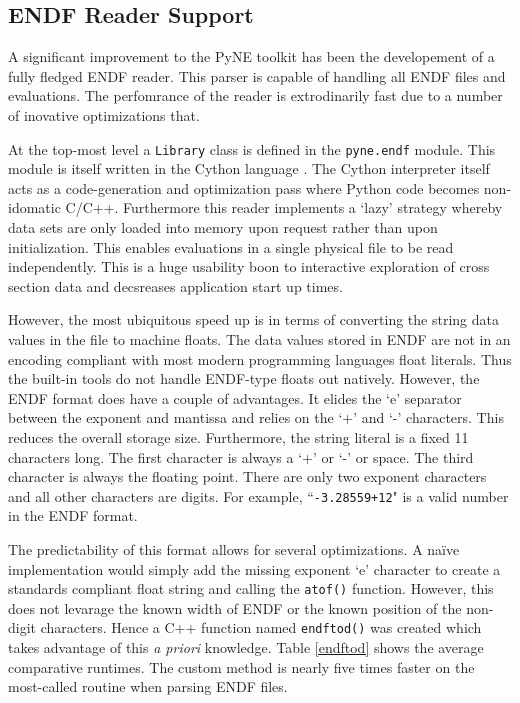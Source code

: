 \documentclass{ansconf}
\begin{document}
\subsection{ENDF Reader Support}

A significant improvement to the PyNE toolkit has been the developement of 
a fully fledged ENDF \cite{mclane2001endf} reader.  This parser is capable 
of handling all ENDF files and evaluations. The perfomrance of the reader is 
extrodinarily fast due to a number of inovative optimizations that.

At the top-most level a \texttt{Library} class is defined in the \texttt{pyne.endf}
module.  This module is itself written in the Cython language \cite{behnel2010cython}.
The Cython interpreter itself acts as a code-generation and optimization pass where
Python code becomes non-idomatic C/C++.  Furthermore this reader implements a
`lazy' strategy whereby data sets are only loaded into memory upon request rather 
than upon initialization.  This enables evaluations in a single physical file to be 
read independently.  This is a huge usability boon to interactive exploration of 
cross section data and decsreases application start up times.

However, the most ubiquitous speed up is in terms of converting the string
data values in the file to machine floats.  The data values stored in ENDF 
are not in an encoding compliant with
most modern programming languages float literals. Thus the built-in tools do not 
handle ENDF-type floats out natively.  However, the ENDF format does have a couple
of advantages.  It elides the `e' separator between the exponent and mantissa and
relies on the `+' and `-' characters.  This reduces the overall storage size.
Furthermore, the string literal is a fixed 11 characters long. The first character
is always a `+' or `-' or space.  The third character is always the floating point.
There are only two exponent characters and all other characters are digits.  
For example, ``\texttt{-3.28559+12}" is a valid number in the ENDF format.

The predictability of this format allows for several optimizations.  A na\"{i}ve 
implementation would simply add the missing exponent `e' character to create
a standards compliant float string and calling the \texttt{atof()} function.  
However, this does not levarage the known width of ENDF or the known position of
the non-digit characters.  Hence a C++ function named \texttt{endftod()} was 
created which takes advantage of this \emph{a priori} knowledge.  Table \ref{endftod}
shows the average comparative runtimes. The custom method is nearly 
five times faster on the most-called routine when parsing ENDF files.
\end{document}
